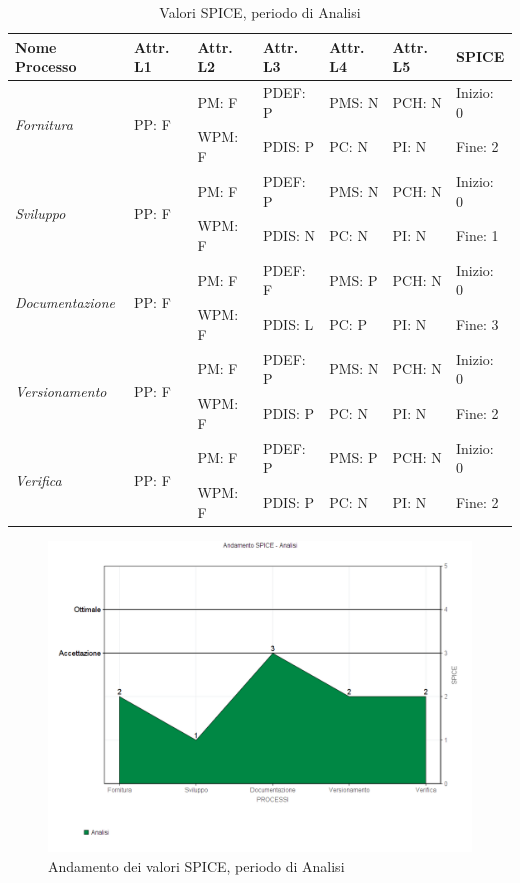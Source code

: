 \documentclass[openany,12pt,a4paper]{report}
\begin{document}
\begin{table}[h]
	\begin{center}
		\setlength\LTleft{-22mm}
		\begin{longtable}{|p{35mm}|p{20mm}|p{20mm}|p{20mm}|p{20mm}|p{20mm}|p{20mm}|}
			\hline
			\textbf{Nome Processo} & \textbf{Attr. L1} & \textbf{Attr. L2} & \textbf{Attr. L3} & \textbf{Attr. L4} & \textbf{Attr. L5} & \textbf{SPICE}\\
			\hline
			\multirow{2}{*}{\textit{Fornitura}} & \multirow{2}{*}{PP: F} & PM: F & PDEF: P & PMS: N & PCH: N & Inizio: 0\\  
			\cline{3-7}
			&          & WPM: F & PDIS: P & PC: N & PI: N & Fine: 2 \\ 
			\hline
			\multirow{2}{*}{\textit{Sviluppo}} & \multirow{2}{*}{PP: F} & PM: F & PDEF: P & PMS: N & PCH: N & Inizio: 0\\  \cline{3-7}
			&          & WPM: F & PDIS: N & PC: N & PI: N & Fine: 1\\
			\hline\multirow{2}{*}{\textit{Documentazione}} & \multirow{2}{*}{PP: F} & PM: F & PDEF: F & PMS: P & PCH: N & Inizio: 0\\  \cline{3-7}
			&          & WPM: F & PDIS: L & PC: P & PI: N & Fine: 3\\ 
			\hline\multirow{2}{*}{\textit{Versionamento}} & \multirow{2}{*}{PP: F} & PM: F & PDEF: P & PMS: N & PCH: N & Inizio: 0\\  \cline{3-7}
			&          & WPM: F & PDIS: P & PC: N & PI: N & Fine: 2\\ 
			\hline\multirow{2}{*}{\textit{Verifica}} & \multirow{2}{*}{PP: F} & PM: F & PDEF: P & PMS: P & PCH: N & Inizio: 0\\  \cline{3-7}
			&          & WPM: F & PDIS: P & PC: N & PI: N & Fine: 2\\ 
			\hline       
		\end{longtable}
	\end{center}
	\caption{Valori SPICE, periodo di Analisi} 
\end{table}

\begin{figure}[H]
	\includegraphics[scale=0.5]{verifica-analisi-spice}
	\centering
	\caption{Andamento dei valori SPICE, periodo di Analisi}
\end{figure}
\end{document}
